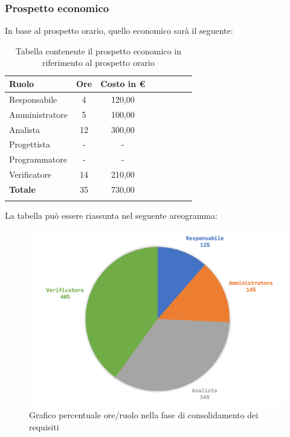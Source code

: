 		\subsubsection{Prospetto economico}
		In base al prospetto orario, quello economico sarà il seguente: 
		
			\begin{longtable}{|l|c|c|c|c|c|c|c|}
				\hline
				\rowcolor{lighter-grayer}
				\textbf{Ruolo} & \textbf{Ore} & \textbf{Costo in €} \\
				\hline
				\endfirsthead
				
				\hline
				Responsabile & 4 & 120,00\\
				\hline
				\hline
				Amministratore & 5 & 100,00\\
				\hline
				\hline
				Analista & 12 & 300,00\\
				\hline
				\hline
				Progettista & - & -\\
				\hline
				\hline
				Programmatore & -  & -\\
				\hline
				\hline
				Verificatore & 14 & 210,00\\
				\hline
				\textbf{Totale} & 35 & 730,00\\
				\hline
				\caption{Tabella contenente il prospetto economico in riferimento al prospetto orario}
			\end{longtable}
			\pagebreak
			
			La tabella può essere riassunta nel seguente areogramma:
			\begin{figure}[H]
				\centering
				\includegraphics[width=0.8\linewidth]{./images/preventivo/consRequisiti2.png}
				\caption{Grafico percentuale ore/ruolo nella fase di consolidamento dei requisiti}
				\label{fig:grafico costi ruolo fase consolidamento dei requisiti}
			\end{figure}
	
